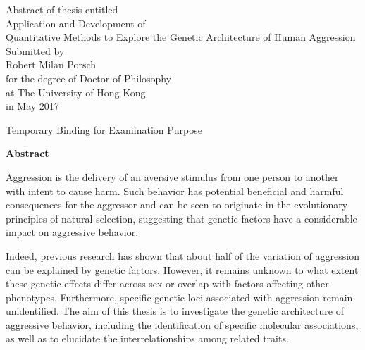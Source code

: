 \documentclass[header.tex]{subfiles}
\begin{document}
\begin{center}
  Abstract of thesis entitled \\
  \vspace*{\baselineskip}
  {\LARGE Application and Development of \\ Quantitative Methods to Explore the Genetic Architecture of Human Aggression}\\[0.2\baselineskip]
  \vspace*{\baselineskip}
  Submitted by\\
  \vspace*{\baselineskip}
  {\LARGE Robert Milan Porsch}\\
  \vspace*{\baselineskip}
  for the degree of Doctor of Philosophy \\ at The University of Hong Kong \\ in May 2017
\end{center}
\vfill
\begin{center}
Temporary Binding for Examination Purpose
\end{center}

\clearpage\null\newpage

\begin{center}
  {\textbf{Abstract}}
\end{center}

Aggression is the delivery of an aversive stimulus from one person to another with intent to cause harm.
Such behavior has potential beneficial and harmful consequences for the aggressor and can be seen to originate in the evolutionary principles of natural selection,
suggesting that genetic factors have a considerable impact on aggressive behavior.

Indeed, previous research has shown that about half of the variation of aggression can be explained by genetic factors.
However, it remains unknown to what extent these genetic effects differ across sex or overlap with factors affecting other phenotypes.
Furthermore, specific genetic loci associated with aggression remain unidentified.
The aim of this thesis is to investigate the  genetic architecture of aggressive behavior, including the identification of specific molecular associations, as well as to elucidate the interrelationships among related traits. 
\end{document}

